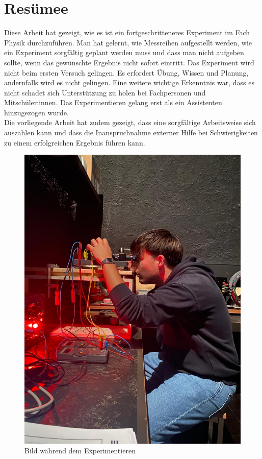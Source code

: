 \section{Resümee}\label{sec:resumee}
Diese Arbeit hat gezeigt, wie es ist ein fortgeschritteneres Experiment im Fach Physik durchzuführen. Man hat gelernt, wie Messreihen aufgestellt werden, wie ein Experiment sorgfältig geplant werden muss und dass man nicht aufgeben sollte, wenn das gewünschte Ergebnis nicht sofort eintritt. Das Experiment wird nicht beim ersten Versuch gelingen. Es erfordert Übung, Wissen und Planung, andernfalls wird es nicht gelingen. Eine weitere wichtige Erkenntnis war, dass es nicht schadet sich Unterstützung zu holen bei Fachpersonen und Mitschüler:innen. Das Experimentieren gelang erst als ein Assistenten hinzugezogen wurde. \\

\noindent Die vorliegende Arbeit hat zudem gezeigt, dass eine sorgfältige Arbeitsweise sich auszahlen kann und dass die Inanspruchnahme externer Hilfe bei Schwierigkeiten zu einem erfolgreichen Ergebnis führen kann.

\begin{figure}[h]
	\centering
	\includegraphics[scale=0.25]{bilder/pdf/bildExperimentieren.pdf}
	\caption{Bild während dem Experimentieren}
	\label{fig:experimentieren}
\end{figure}
